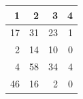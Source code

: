 \begin{tabular}{rrrr}
\toprule
1 & 2 & 3 & 4 \\
\midrule
17 & 31 & 23 & 1 \\
2 & 14 & 10 & 0 \\
4 & 58 & 34 & 4 \\
46 & 16 & 2 & 0 \\
\bottomrule
\end{tabular}
